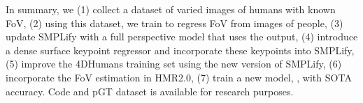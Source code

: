In summary, we (1) collect a dataset of varied images of humans with known FoV, (2) using this dataset, we train \cameramodel to regress FoV from images of people, (3) update SMPLify with a full perspective model that uses the \cameramodel output,  (4) introduce a dense surface keypoint regressor and incorporate these keypoints into SMPLify,
(5) improve the 4DHumans training set using the new version of SMPLify, (6) incorporate the FoV estimation in HMR2.0, (7) train a new model, \hpsmodel, with SOTA accuracy.
Code and pGT dataset is available for research purposes.
